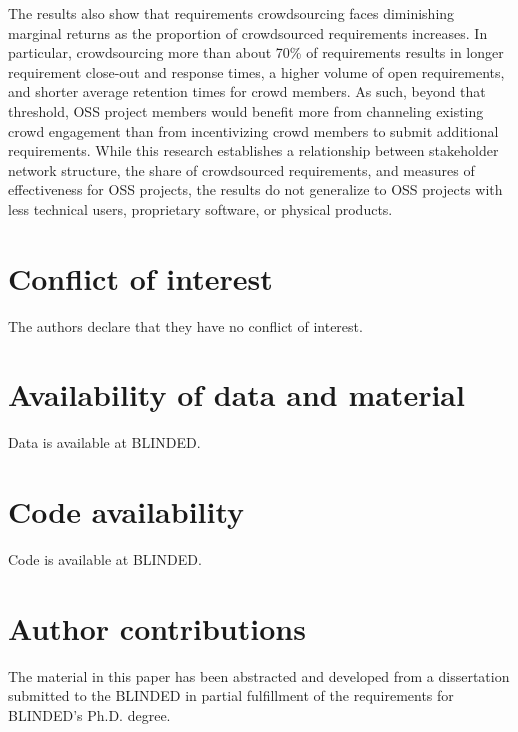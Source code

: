 The results also show that requirements crowdsourcing faces diminishing marginal returns as the proportion of crowdsourced requirements increases. In particular, crowdsourcing more than about 70\% of requirements results in longer requirement close-out and response times, a higher volume of open requirements, and shorter average retention times for crowd members. As such, beyond that threshold, OSS project members would benefit more from channeling existing crowd engagement than from incentivizing crowd members to submit additional requirements. While this research establishes a relationship between stakeholder network structure, the share of crowdsourced requirements, and measures of effectiveness for OSS projects, the results do not generalize to OSS projects with less technical users, proprietary software, or physical products.

 \section*{Conflict of interest}

The authors declare that they have no conflict of interest.

\section*{Availability of data and material}

Data is available at BLINDED.

\section*{Code availability}

Code is available at BLINDED.

\section*{Author contributions}

The material in this paper has been abstracted and developed from a dissertation submitted to the BLINDED in partial fulfillment of the requirements for BLINDED's Ph.D. degree.

